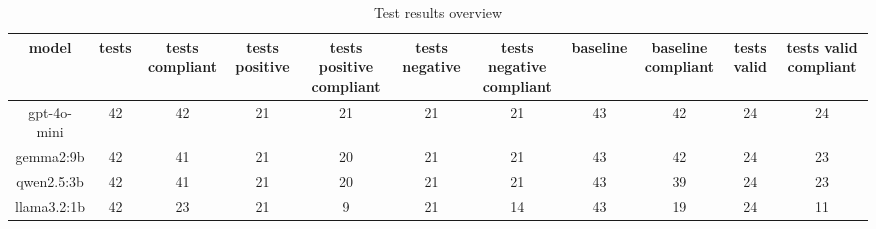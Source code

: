 
  \begin{table}[h!]
  \centering
  \begin{tabular}{|c|c|c|c|c|c|c|c|c|c|c|}
  \hline
  model & tests & tests compliant & tests positive & tests positive compliant & tests negative & tests negative compliant & baseline & baseline compliant & tests valid & tests valid compliant \\
  \hline
  gpt-4o-mini & 42 & 42 & 21 & 21 & 21 & 21 & 43 & 42 & 24 & 24\\
\hline
gemma2:9b & 42 & 41 & 21 & 20 & 21 & 21 & 43 & 42 & 24 & 23\\
\hline
qwen2.5:3b & 42 & 41 & 21 & 20 & 21 & 21 & 43 & 39 & 24 & 23\\
\hline
llama3.2:1b & 42 & 23 & 21 & 9 & 21 & 14 & 43 & 19 & 24 & 11
  \end{tabular}
  \caption{Test results overview}
  
  \end{table}
  